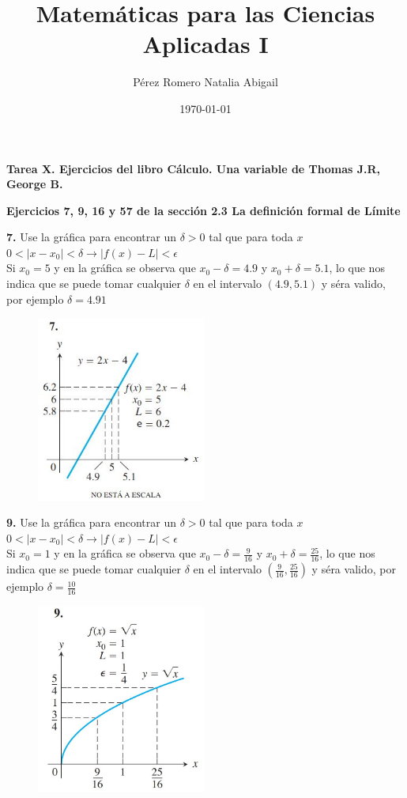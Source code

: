 \documentclass[12pt, letterpaper]{article}
\title{Matemáticas para las Ciencias Aplicadas I}
\author{Pérez Romero Natalia Abigail}
\date{\today}
\begin{document}
\maketitle
\textbf{Tarea X. Ejercicios del libro Cálculo. Una variable de Thomas J.R, George B.}

\textbf{Ejercicios 7, 9, 16 y 57 de  la sección 2.3 La definición formal de Límite}

\textbf{7.} Use la gráfica para encontrar un $\delta > 0$ tal que para toda $x$\\
$0 < | x - x_0| < \delta \rightarrow | f(x)-L |<\epsilon$\\

Si $x_0 = 5$ y en la gráfica se observa que $x_0 - \delta = 4.9$ y $x_0 + \delta = 5.1$, lo que nos indica que se puede tomar cualquier $\delta$ en el intervalo $(4.9, 5.1)$ y séra valido, por ejemplo $\delta = 4.91$

\begin{figure}[tbh]
\centering
\includegraphics[width=15em]{t10uno}
\end{figure}

\newpage
\textbf{9.} Use la gráfica para encontrar un $\delta > 0$ tal que para toda $x$\\
 $0 < | x - x_0| < \delta \rightarrow | f(x)-L |<\epsilon$\\

Si $x_0 = 1$ y en la gráfica se observa que $x_0 - \delta = \frac{9}{16}$ y $x_0 + \delta = \frac{25}{16}$,  lo que nos indica que se puede tomar cualquier $\delta$ en el intervalo $(\frac{9}{16}, \frac{25}{16})$ y séra valido, por ejemplo $\delta = \frac{10}{16}$

\begin{figure}[tbh]
\centering
\includegraphics[width=15em]{t10dos}
\end{figure}
\end{document}
